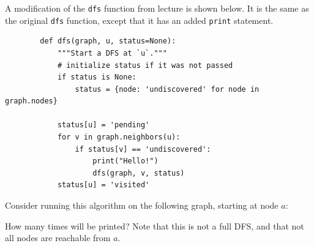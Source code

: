 \Needspace{6.5in}

\begin{prob}

    A modification of the \texttt{dfs} function from lecture is shown below.
    It is the same as the original \texttt{dfs} function, except that it has
    an added \texttt{print} statement.

    \begin{verbatim}
        def dfs(graph, u, status=None):
            """Start a DFS at `u`."""
            # initialize status if it was not passed
            if status is None:
                status = {node: 'undiscovered' for node in graph.nodes}

            status[u] = 'pending'
            for v in graph.neighbors(u):
                if status[v] == 'undiscovered':
                    print("Hello!")
                    dfs(graph, v, status)
            status[u] = 'visited'
    \end{verbatim}

    Consider running this algorithm on the following graph, starting at node $a$:

    \begin{center} 
    \end{center}

    How many times will  be printed? Note that this is not a full DFS, and
    that not all nodes are reachable from $a$.


\end{prob}

